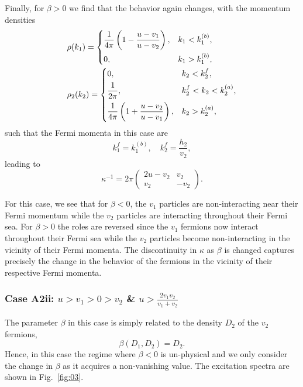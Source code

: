 \documentclass[aps,pra,
superscriptaddress,
reprint,twocolumn,preprintnumbers,
amsmath,amssymb,
nofootinbib]{revtex4-1}
\newcommand{\beq}{\begin{equation}}
\newcommand{\eeq}{\end{equation}}
\begin{document}
Finally, for $\beta>0$ we find that the behavior again changes, with the momentum densities
        \begin{align}
        &\rho(k_1) = 
        \begin{dcases}
        \frac{1}{4\pi} \left(1 - \frac{u - v_1}{u - v_2} \right), &k_1<k_1^{(b)}, \\
        0, &k_1>k_1^{(b)},
        \end{dcases}\nonumber\\
        &\rho_2(k_2) = 
        \begin{dcases}
        0, &k_2<k_2^f,\\
        \frac{1}{2\pi}, &k_2^f<k_2<k_2^{(a)},\\
        \frac{1}{4\pi} \left(1 + \frac{u - v_2}{u - v_1} \right), &k_2>k_2^{(a)},
        \end{dcases}
        \end{align}
such that the Fermi momenta in this case are        
        \beq
		k_1^f = k_1^{(b)},\quad k_2^f =\frac{h_2}{v_2},
		\eeq
leading to
        \begin{equation}
        \kappa^{-1} = 2 \pi \left(
        \begin{array}{cc}
        2 u - v_2 & v_2\\
        v_2 & -v_2
        \end{array} \right).
        \end{equation}
        
For this case, we see that for $\beta<0$, the $v_1$ particles are non-interacting near their Fermi momentum while the $v_2$ particles are interacting throughout their Fermi sea. For $\beta>0$ the roles are reversed since the $v_1$ fermions now interact throughout their Fermi sea while the $v_2$ particles become non-interacting in the vicinity of their Fermi momenta. The discontinuity in $\kappa$ as $\beta$ is changed captures precisely the change in the behavior of the fermions in the vicinity of their respective Fermi momenta.

        \subsubsection{Case A2ii: $u>v_1>0>v_2$ \& $u > \frac{2 v_1 v_2}{v_1 + v_2}$}  
        \label{sec:A2b}
        
The parameter $\beta$ in this case is simply related to the density $D_2$ of the $v_2$ fermions,        
        \begin{equation}
        \beta(D_1,D_2) = D_2.
        \end{equation}
Hence, in this case the regime where $\beta<0$ is un-physical and we only consider the change in $\beta$ as it acquires a non-vanishing value. The excitation spectra are shown in Fig.~\ref{fig:03}.     
\end{document}
